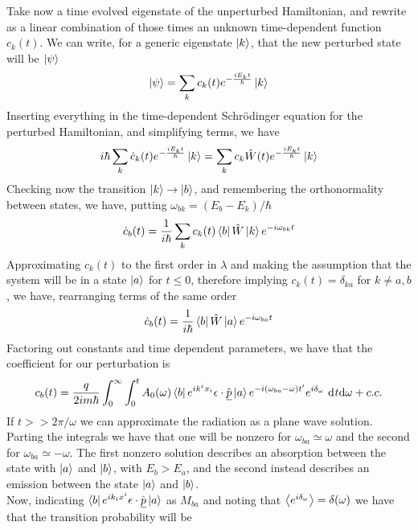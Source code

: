 \documentclass[../qm.tex]{subfiles}
\begin{document}
	Take now a time evolved eigenstate of the unperturbed Hamiltonian, and rewrite as a linear combination of those times an unknown time-dependent function $c_k(t)$. We can write, for a generic eigenstate $\ket{k}$, that the new perturbed state will be $\ket{\psi}$
	\begin{equation}
		\ket{\psi}=\sum_kc_k(t)e^{-\frac{iE_kt}{\hbar}}\ket{k}
		\label{eq:perturbedempsi}
	\end{equation}
	Inserting everything in the time-dependent Schrödinger equation for the perturbed Hamiltonian, and simplifying terms, we have
	\begin{equation}
		i\hbar\sum_k\dot{c}_k(t)e^{-\frac{iE_kt}{\hbar}}\ket{k}=\sum_kc_k\hat{W}(t)e^{-\frac{iE_kt}{\hbar}}\ket{k}
		\label{eq:tdsep}
	\end{equation}
	Checking now the transition $\ket{k}\to\ket{b}$, and remembering the orthonormality between states, we have, putting $\omega_{bk}=(E_b-E_k)/\hbar$
	\begin{equation}
		\dot{c}_b(t)=\frac{1}{i\hbar}\sum_kc_k(t)\bra{b}\hat{W}\ket{k}e^{-i\omega_{bk}t}
	\end{equation}
	Approximating $c_k(t)$ to the first order in $\lambda$ and making the assumption that the system will be in a state $\ket{a}$ for $t\le0$, therefore implying $c_k(t)=\delta_{ka}$ for $k\ne a,b$, we have, rearranging terms of the same order
	\begin{equation}
		\dot{c}_b(t)=\frac{1}{i\hbar}\bra{b}\hat{W}\ket{a}e^{-i\omega_{ba}t}
	\end{equation}
	Factoring out constants and time dependent parameters, we have that the coefficient for our perturbation is
	\begin{equation}
		c_b(t)=\frac{q}{2im\hbar}\int_{0}^{\infty}\int_0^tA_0(\omega)\bra{b}e^{ik^ix_i}\epsilon\cdot\hat{\underline{p}}\ket{a}e^{-i(\omega_{ba}-\omega)t'}e^{i\delta_\omega}\ \mathrm{d}^{}t\dd\omega+c.c.
		\label{eq:transitionprobqem}
	\end{equation}
	If $t>>2\pi/\omega$ we can approximate the radiation as a plane wave solution. Parting the integrals we have that one will be nonzero for $\omega_{ba}\simeq\omega$ and the second for $\omega_{ba}\simeq-\omega$. The first nonzero solution describes an absorption between the state with $\ket{a}$ and $\ket{b}$, with $E_b>E_a$, and the second instead describes an emission between the state $\ket{a}$ and $\ket{b}$.\\
	Now, indicating $\bra{b}e^{ik_ix^i}\epsilon\cdot\hat{\underline{p}}\ket{a}$ as $M_{ba}$ and noting that $\expval{e^{i\delta_{\omega}}}=\delta(\omega)$ we have that the transition probability will be
\end{document}
